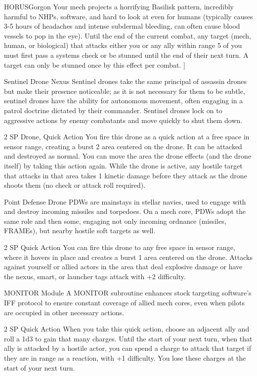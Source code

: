 \begin{mech}{HORUS}{Gorgon}
{Your mech projects a horrifying Basilisk pattern, incredibly harmful to NHPs, software, and hard to look at even for humans (typically causes 3-5 hours of headaches and intense subdermal bleeding, can often cause blood vessels to pop in the eye). Until the end of the current combat, any target (mech, human, or biological) that attacks either you or any ally within range 5 of you must first pass a systems check or be stunned until the end of their next turn. A target can only be stunned once by this effect per combat.
}]


Sentinel Drone Nexus
Sentinel drones take the same principal of assassin drones but make their presence noticeable; as it is not necessary for them to be subtle, sentinel drones have the ability for autonomous movement, often engaging in a patrol doctrine dictated by their commander. Sentinel drones lock on to aggressive actions by enemy combatants and move quickly to shut them down.

2 SP
Drone, Quick Action
You fire this drone as a quick action at a free space in sensor range, creating a burst 2 area centered on the drone. It can be attacked and destroyed as normal. You can move the area the drone effects (and the drone itself) by taking this action again. While the drone is active, any hostile target that attacks in that area takes 1 kinetic damage before they attack as the drone shoots them (no check or attack roll required).

Point Defense Drone
PDWs are mainstays in stellar navies, used to engage with and destroy incoming missiles and torpedoes. On a mech core, PDWs adopt the same role and then some, engaging not only incoming ordnance (missiles, FRAMEs), but nearby hostile soft targets as well.

2 SP
Quick Action
You can fire this drone to any free space in sensor range, where it hovers in place and creates a burst 1 area centered on the drone. Attacks against yourself or allied actors in the area that deal explosive damage or have the nexus, smart, or launcher tags attack with +2 difficulty.

MONITOR Module
A MONITOR subroutine enhances stock targeting software's IFF protocol to ensure constant coverage of allied mech cores, even when pilots are occupied in other necessary actions.

2 SP
Quick Action
When you take this quick action, choose an adjacent ally and roll a 1d3 to gain that many charges. Until the start of your next turn, when that ally is attacked by a hostile actor, you can spend a charge to attack that target if they are in range as a reaction, with +1 difficulty. You lose these charges at the start of your next turn.


\end{mech}

